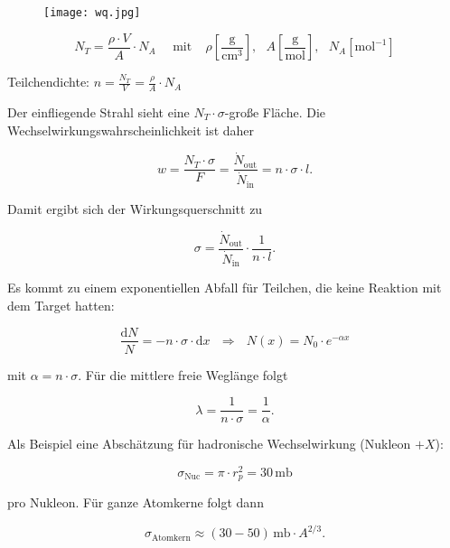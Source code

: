 \begin{figure}[H]
	\centering
	\texttt{[image: wq.jpg]}
\end{figure}


\[ N_T = \frac{\rho\cdot V}{A}\cdot N_A~~~~~~ \text{mit}~~~~~ \rho
\left[\frac{\text{g}}{\text{cm}^3} \right],~~~A\left[\frac{\text{g}}{\text{mol}} \right],~~~N_A\left[\text{mol}^{-1} \right] \] 

Teilchendichte: $n=\frac{N_T}{V}=\frac{\rho}{A}\cdot N_A$

Der einfliegende Strahl sieht eine $N_T\cdot\sigma$-große Fläche. Die
Wechselwirkungswahrscheinlichkeit ist daher

\[w= \frac{N_T\cdot\sigma}{F} = \frac{\dot{N}_\text{out}}{\dot{N}_\text{in}} = n\cdot \sigma \cdot
l. \]

Damit ergibt sich der Wirkungsquerschnitt zu 

\[\sigma =\frac{\dot{N}_\text{out}}{\dot{N}_\text{in}}\cdot \frac{1}{n\cdot l} . \]

Es kommt zu einem exponentiellen Abfall für Teilchen, die keine Reaktion mit dem Target hatten:

\[\frac{\mathrm{d}N}{N} = -n\cdot \sigma\cdot \mathrm{d} x ~~~\Rightarrow~~~ N(x)=N_0\cdot
e^{-\alpha x}
\]

mit $\alpha=n\cdot \sigma$. Für die mittlere freie Weglänge folgt

\[\lambda =\frac{1}{n\cdot\sigma}=\frac{1}{\alpha}.  \]

Als Beispiel eine Abschätzung für hadronische Wechselwirkung (Nukleon $+X$):

\[\sigma_\text{Nuc} = \pi\cdot r_p^2 = 30\,\text{mb} \]

pro Nukleon. Für ganze Atomkerne folgt dann

\[\sigma_\text{Atomkern} \approx (30-50)\,\text{mb}\cdot A^{2/3}.\]
